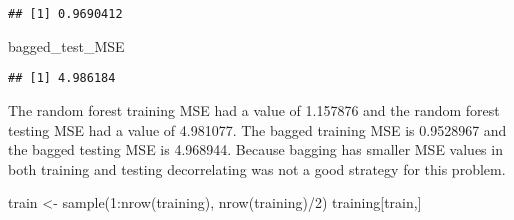 \documentclass[
]{article}
\newenvironment{Shaded}{\begin{snugshade}}{\end{snugshade}}
\newcommand{\DecValTok}[1]{\textcolor[rgb]{0.00,0.00,0.81}{#1}}
\newcommand{\FunctionTok}[1]{\textcolor[rgb]{0.00,0.00,0.00}{#1}}
\newcommand{\NormalTok}[1]{#1}
\newcommand{\OtherTok}[1]{\textcolor[rgb]{0.56,0.35,0.01}{#1}}
\newcommand{\SpecialCharTok}[1]{\textcolor[rgb]{0.00,0.00,0.00}{#1}}
\begin{document}
\begin{verbatim}
## [1] 0.9690412
\end{verbatim}

\begin{Shaded}
\begin{Highlighting}[]
\NormalTok{bagged\_test\_MSE}
\end{Highlighting}
\end{Shaded}

\begin{verbatim}
## [1] 4.986184
\end{verbatim}

The random forest training MSE had a value of 1.157876 and the random
forest testing MSE had a value of 4.981077. The bagged training MSE is
0.9528967 and the bagged testing MSE is 4.968944. Because bagging has
smaller MSE values in both training and testing decorrelating was not a
good strategy for this problem.

\begin{Shaded}
\begin{Highlighting}[]
\NormalTok{train }\OtherTok{\textless{}{-}} \FunctionTok{sample}\NormalTok{(}\DecValTok{1}\SpecialCharTok{:}\FunctionTok{nrow}\NormalTok{(training), }\FunctionTok{nrow}\NormalTok{(training)}\SpecialCharTok{/}\DecValTok{2}\NormalTok{)}
\NormalTok{training[train,]}
\end{Highlighting}
\end{Shaded}
\end{document}
